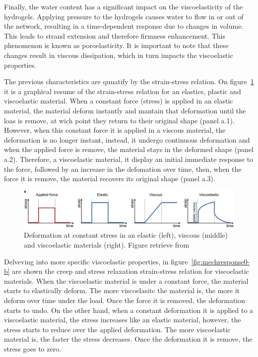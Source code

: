 Finally, the water content has a significant impact on the viscoelasticity of the hydrogels.
Applying pressure to the hydrogels causes water to flow in or out of the network, resulting in a time-dependent response due to changes in volume. This leads to strand extension and therefore firmness enhancement.
This phenomenon is known as poroelasticity. 
It is important to note that these changes result in viscous dissipation, which in turn impacts the viscoelastic properties\citep{sheikoArchitecturalCodeRubber2019,courbotRoleExtracellularMatrix2025}.

The previous characteristics are qunatify by the strain-stress relation.
On figure~\ref{fig:mechresponse0-a} it is a graphical resume of the strain-stress relation for an elastics, plastic and viscoelastic material.
When a constant force (stress) is applied in an elastic material, the material deform instantly and mantain that deformation until the loas is remove, at wich point they return to their original shape (panel a.1).
However, when this constant force it is applied in a viscous material, the deformation is no longer instant, instead, it undergo continuous deformation and when the applied force is remove, the material stays in the deformed shape (panel a.2).
Therefore, a viscoelastic material, it display an initial immediate response to the force, followed by an increase in the defomation over time, then, when the force it is remove, the material recovers its original shape (panel a.3).

\begin{figure}[ht!]
    \centering
    \centering
    \includegraphics[width=\textwidth]{figs/mechResponse/0-a.png}
    \caption{Deformation at constant stress in an elastic (left), viscous (middle) and viscoelastic materials (right). Figure retrieve from\citep{courbotRoleExtracellularMatrix2025}}\label{fig:mechresponse0-a}
\end{figure}

Delveving into more specific viscoelastic properties, in figure~\ref{fig:mechresponse0-b} are shown the creep and stress relaxation strain-stress relation for viscoelastic materials.
When the viscoelastic material is under a constant force, the material starts to elastically deform.
The more viscoelasitc the material is, the more it deform over time under the load.
Once the force it is removed, the deformation starts to undo.
On the other hand, when a constant deformation it is applied to a viscoelastic material, the stress increases like an elastic material, however, the stress starts to reduce over the applied deformation.
The more viscoelastic material is, the faster the stress decreases. 
Once the deformation it is remove, the stress goes to zero.

